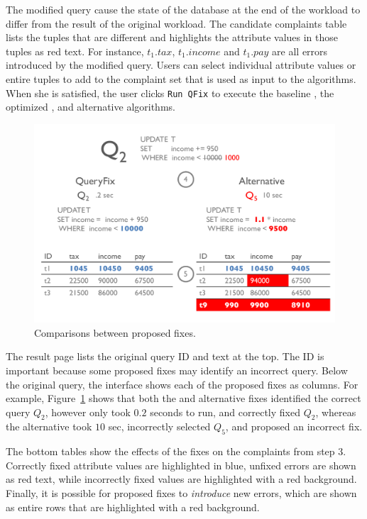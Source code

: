 The modified query cause the state of the database at the end of the workload
to differ from the result of the original workload.  The candidate complaints table lists the tuples
that are different and highlights the attribute values in those tuples as red text.  For instance,
$t_1.tax$, $t_1.income$ and $t_1.pay$ are all errors introduced by the modified query. 
Users can select individual attribute values or entire tuples to add to the complaint set that is used as input to the \sys algorithms.  
When she is satisfied, the user clicks \texttt{Run QFix} to execute the baseline \sys, the optimized \sys, and alternative algorithms.


\begin{figure}[t]
\centering
  \includegraphics[width = .8\columnwidth]{figures/demo2_exp2}
  \vspace*{-0.2in}
  \caption{Comparisons between proposed fixes.}
  \label{f:demo2} 
  \vspace*{-.2in}
\end{figure}


  The result page lists the original query ID and text at the top.  The ID 
is important because some proposed fixes may identify an incorrect query.  Below the original query,
the interface shows each of the proposed fixes as columns.  For example, Figure~\ref{f:demo2} shows 
that both the \sys and alternative fixes identified the correct query $Q_2$, however \sys only took $0.2$ seconds
to run, and correctly fixed $Q_2$, whereas the alternative took $10$ sec, 
incorrectly selected $Q_5$, and proposed an incorrect fix.

 The bottom tables show the effects of the fixes on the complaints from
step 3.  Correctly fixed attribute values are highlighted in blue, unfixed errors are shown as red text, while incorrectly
fixed values are highlighted with a red background.  Finally, it is possible for proposed fixes to 
{\it introduce} new errors, which are shown as entire rows that are highlighted with a red background.







